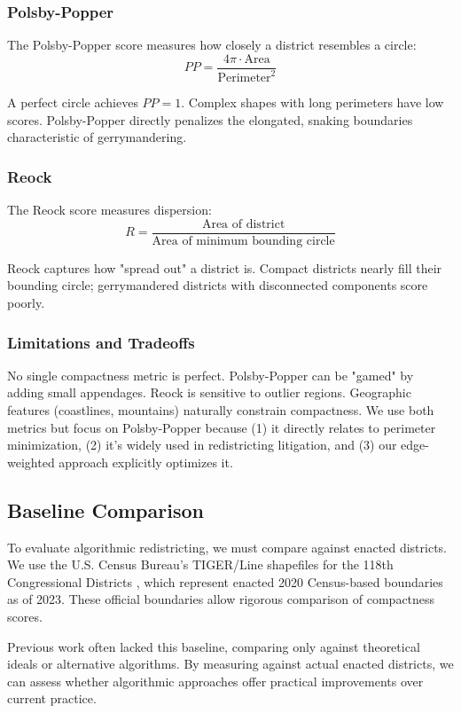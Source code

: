 \subsubsection{Polsby-Popper}

The Polsby-Popper score \cite{polsby1991third} measures how closely a district resembles a circle:
\[
PP = \frac{4\pi \cdot \text{Area}}{\text{Perimeter}^2}
\]

A perfect circle achieves $PP = 1$. Complex shapes with long perimeters have low scores. Polsby-Popper directly penalizes the elongated, snaking boundaries characteristic of gerrymandering.

\subsubsection{Reock}

The Reock score \cite{reock1961measuring} measures dispersion:
\[
R = \frac{\text{Area of district}}{\text{Area of minimum bounding circle}}
\]

Reock captures how "spread out" a district is. Compact districts nearly fill their bounding circle; gerrymandered districts with disconnected components score poorly.

\subsubsection{Limitations and Tradeoffs}

No single compactness metric is perfect. Polsby-Popper can be "gamed" by adding small appendages. Reock is sensitive to outlier regions. Geographic features (coastlines, mountains) naturally constrain compactness. We use both metrics but focus on Polsby-Popper because (1) it directly relates to perimeter minimization, (2) it's widely used in redistricting litigation, and (3) our edge-weighted approach explicitly optimizes it.

\subsection{Baseline Comparison}

To evaluate algorithmic redistricting, we must compare against enacted districts. We use the U.S. Census Bureau's TIGER/Line shapefiles for the 118th Congressional Districts \cite{census2023tigerline}, which represent enacted 2020 Census-based boundaries as of 2023. These official boundaries allow rigorous comparison of compactness scores.

Previous work often lacked this baseline, comparing only against theoretical ideals or alternative algorithms. By measuring against actual enacted districts, we can assess whether algorithmic approaches offer practical improvements over current practice.

